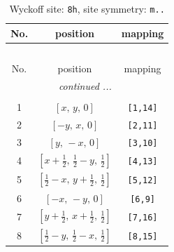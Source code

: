 \documentclass[fleqn,8pt]{jsarticle}
\begin{document}
\begin{longtable}{ccc}
\caption{Wyckoff site: {\tt 8h}, site symmetry: {\tt m..}}
 \\
 \hline \hline
No. & position & mapping \\ \hline \endfirsthead

\multicolumn{2}{l}{\tablename\ \thetable{}} \\
 \hline \hline
No. & position & mapping \\ \hline \endhead

 \hline \hline
\multicolumn{2}{r}{\footnotesize\it continued ...} \\ \endfoot

 \hline \hline
\multicolumn{2}{r}{} \\ \endlastfoot

1 & $\left[ x,\, y,\, 0 \right]$ & {\tt [1,14]} \\ \hline
2 & $\left[ - y,\, x,\, 0 \right]$ & {\tt [2,11]} \\ \hline
3 & $\left[ y,\, - x,\, 0 \right]$ & {\tt [3,10]} \\ \hline
4 & $\left[ x + \frac{1}{2},\, \frac{1}{2} - y,\, \frac{1}{2} \right]$ & {\tt [4,13]} \\ \hline
5 & $\left[ \frac{1}{2} - x,\, y + \frac{1}{2},\, \frac{1}{2} \right]$ & {\tt [5,12]} \\ \hline
6 & $\left[ - x,\, - y,\, 0 \right]$ & {\tt [6,9]} \\ \hline
7 & $\left[ y + \frac{1}{2},\, x + \frac{1}{2},\, \frac{1}{2} \right]$ & {\tt [7,16]} \\ \hline
8 & $\left[ \frac{1}{2} - y,\, \frac{1}{2} - x,\, \frac{1}{2} \right]$ & {\tt [8,15]} \\
\end{longtable}
\renewcommand{\arraystretch}{1.2}
\end{document}
